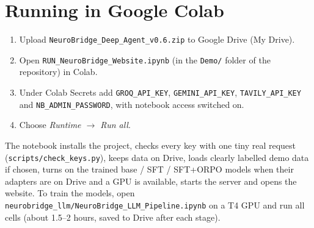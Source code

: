 \documentclass[11pt,a4paper]{article}
\newcommand{\code}[1]{\texttt{#1}}
\begin{document}
\section{Running in Google Colab}\label{app:colab}
\begin{enumerate}
  \item Upload \code{NeuroBridge\_Deep\_Agent\_v0.6.zip} to Google Drive (My Drive).
  \item Open \code{RUN\_NeuroBridge\_Website.ipynb} (in the \code{Demo/} folder of the repository) in Colab.
  \item Under Colab Secrets add \code{GROQ\_API\_KEY}, \code{GEMINI\_API\_KEY}, \code{TAVILY\_API\_KEY} and
        \code{NB\_ADMIN\_PASSWORD}, with notebook access switched on.
  \item Choose \emph{Runtime $\rightarrow$ Run all}.
\end{enumerate}
The notebook installs the project, checks every key with one tiny real request
(\code{scripts/check\_keys.py}), keeps data on Drive, loads clearly labelled demo data if chosen, turns on
the trained base / SFT / SFT+ORPO models when their adapters are on Drive and a GPU is available, starts the
server and opens the website. To train the models, open
\code{neurobridge\_llm/NeuroBridge\_LLM\_Pipeline.ipynb} on a T4 GPU and run all cells (about 1.5--2 hours,
saved to Drive after each stage).
\end{document}

